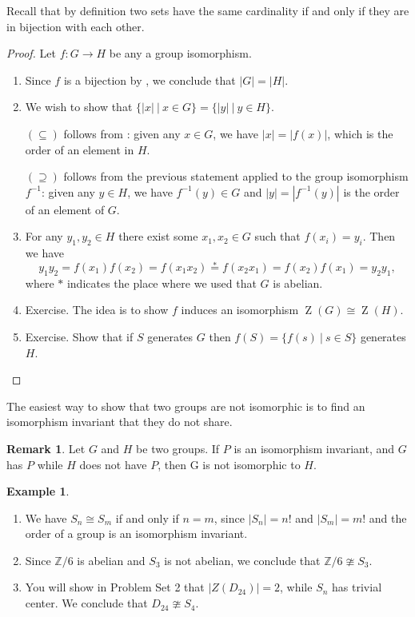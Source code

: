 \documentclass[12pt]{report}
\numberwithin{equation}{section}
\numberwithin{theorem}{chapter}
\theoremstyle{definition}
\newtheorem{example}[theorem]{Example}
\newtheorem*{basic properties}{Basic Properties}
\newtheorem*{Important Remark}{Important Remark}
\newtheorem{remark}[theorem]{Remark}
\newcommand{\Z}{\mathbb{Z}}
\DeclareMathOperator{\Zc}{Z}
\begin{document}
Recall that by definition two sets have the same cardinality if and only if they are in bijection with each other.


\begin{proof}
Let $f\!:G\to H$ be any a group isomorphism.

\begin{enumerate}[leftmargin=20pt,label=(\alph*)]
\item Since $f$ is a bijection by , we conclude that $|G|=|H|$.

\item We wish to show that $\{|x| \ | \ x\in G\}= \{|y| \ | \ y\in H\}$. 

$(\subseteq)$ follows from : given any $x\in G$, we have $|x| = |f(x)|$, which is the order of an element in $H$.

$(\supseteq)$ follows from the previous statement applied to the group isomorphism $f^{-1}$: given any $y\in H$, we have $f^{-1}(y)\in G$ and $|y| = |f^{-1}(y)|$ is the order of an element of $G$.

\item For any $y_1,y_2\in H$ there exist some $x_1, x_2\in G$ such that $f(x_i)=y_i$. Then we have
$$y_1y_2=f(x_1)f(x_2)=f(x_1x_2)\stackrel{*}{=}f(x_2x_1)=f(x_2)f(x_1)=y_2y_1,$$
where $*$ indicates the place where we used that $G$ is abelian.
\item Exercise. The idea is to show $f$ induces an isomorphism $\Zc(G)\cong \Zc(H)$.
\item Exercise. Show that if $S$ generates $G$ then $f(S)=\{f(s) \ | \ s\in S\}$ generates $H$.\qedhere
\end{enumerate}
\end{proof}


The easiest way to show that two groups are not isomorphic is to find an isomorphism invariant that they do not share.

\begin{remark}
	Let $G$ and $H$ be two groups. If $P$ is an isomorphism invariant, and $G$ has $P$ while $H$ does not have $P$, then G is not isomorphic to $H$.
\end{remark}



\begin{example}$\,$
\begin{enumerate}
\item We have $S_n\cong S_m$ if and only if $n=m$, since $|S_n| = n!$ and $|S_m| = m!$ and the order of a group is an isomorphism invariant.
\item Since $\Z/6$ is abelian and $S_3$ is not abelian, we conclude that $\Z/6\ncong S_3$.
\item You will show in Problem Set 2 that $|Z(D_{24})|=2$, while $S_n$ has trivial center. We conclude that $D_{24}\ncong S_4$.
\end{enumerate}
\end{example}
\end{document}
